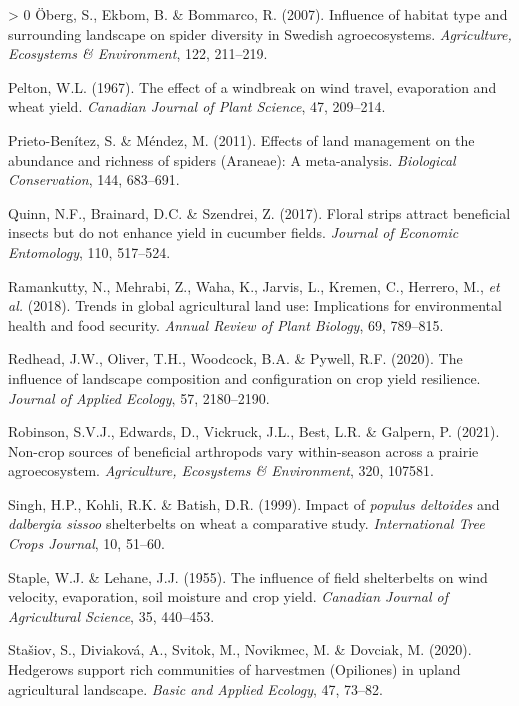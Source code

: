 \documentclass[]{elsarticle} %
\newlength{\cslhangindent}
\newenvironment{CSLReferences}[3] %
 {%
  \setlength{\parindent}{0pt}
  \ifodd #1 \everypar{\setlength{\hangindent}{\cslhangindent}}\ignorespaces\fi
  \ifnum #2 > 0
  \setlength{\parskip}{#2\baselineskip}
  \fi
 }%
 {}
\begin{document}
\begin{CSLReferences}{1}{0}
\leavevmode\hypertarget{ref-oberg2007}{}%
Öberg, S., Ekbom, B. \& Bommarco, R. (2007). Influence of habitat type and surrounding landscape on spider diversity in {Swedish} agroecosystems. \emph{Agriculture, Ecosystems {\&} Environment}, 122, 211--219.

\leavevmode\hypertarget{ref-pelton1967}{}%
Pelton, W.L. (1967). The effect of a windbreak on wind travel, evaporation and wheat yield. \emph{Canadian Journal of Plant Science}, 47, 209--214.

\leavevmode\hypertarget{ref-prietoBenitez2011}{}%
Prieto-Benítez, S. \& Méndez, M. (2011). Effects of land management on the abundance and richness of spiders ({Araneae}): A meta-analysis. \emph{Biological Conservation}, 144, 683--691.

\leavevmode\hypertarget{ref-quinn2017}{}%
Quinn, N.F., Brainard, D.C. \& Szendrei, Z. (2017). Floral strips attract beneficial insects but do not enhance yield in cucumber fields. \emph{Journal of Economic Entomology}, 110, 517--524.

\leavevmode\hypertarget{ref-ramankutty2018}{}%
Ramankutty, N., Mehrabi, Z., Waha, K., Jarvis, L., Kremen, C., Herrero, M., \emph{et al.} (2018). Trends in global agricultural land use: Implications for environmental health and food security. \emph{Annual Review of Plant Biology}, 69, 789--815.

\leavevmode\hypertarget{ref-redhead2020}{}%
Redhead, J.W., Oliver, T.H., Woodcock, B.A. \& Pywell, R.F. (2020). The influence of landscape composition and configuration on crop yield resilience. \emph{Journal of Applied Ecology}, 57, 2180--2190.

\leavevmode\hypertarget{ref-robinson2021}{}%
Robinson, S.V.J., Edwards, D., Vickruck, J.L., Best, L.R. \& Galpern, P. (2021). Non-crop sources of beneficial arthropods vary within-season across a prairie agroecosystem. \emph{Agriculture, Ecosystems {\&} Environment}, 320, 107581.

\leavevmode\hypertarget{ref-singh1999}{}%
Singh, H.P., Kohli, R.K. \& Batish, D.R. (1999). Impact of \emph{populus deltoides} and \emph{dalbergia sissoo} shelterbelts on wheat {}a comparative study. \emph{International Tree Crops Journal}, 10, 51--60.

\leavevmode\hypertarget{ref-staple1955}{}%
Staple, W.J. \& Lehane, J.J. (1955). The influence of field shelterbelts on wind velocity, evaporation, soil moisture and crop yield. \emph{Canadian Journal of Agricultural Science}, 35, 440--453.

\leavevmode\hypertarget{ref-stasiov2020}{}%
Stašiov, S., Diviaková, A., Svitok, M., Novikmec, M. \& Dovciak, M. (2020). Hedgerows support rich communities of harvestmen ({Opiliones}) in upland agricultural landscape. \emph{Basic and Applied Ecology}, 47, 73--82.


\end{CSLReferences}
\end{document}

